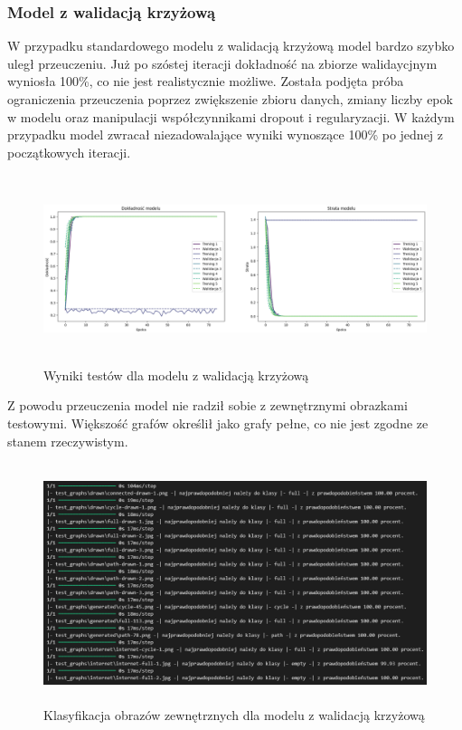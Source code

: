 \subsubsection{Model z walidacją krzyżową}

W przypadku standardowego modelu z walidacją krzyżową model bardzo szybko uległ przeuczeniu.
Już po szóstej iteracji dokładność na zbiorze walidaycjnym wyniosła 100\%, co nie jest realistycznie możliwe.
Została podjęta próba ograniczenia przeuczenia poprzez zwiększenie zbioru danych, zmiany liczby epok w modelu
oraz manipulacji współczynnikami dropout i regularyzacji.
W każdym przypadku model zwracał niezadowalające wyniki wynoszące 100\% po jednej z początkowych iteracji.

\begin{figure}[ht]
	\centering
	\includegraphics[height=5.5cm]{partials/images/tests/v2_crossvalid.png}
	\caption{Wyniki testów dla modelu z walidacją krzyżową}
	\label{Fig:tests-cv-1}
\end{figure}
\FloatBarrier

Z powodu przeuczenia model nie radził sobie z zewnętrznymi obrazkami testowymi.
Większość grafów określił jako grafy pełne, co nie jest zgodne ze stanem rzeczywistym.

\begin{figure}[ht]
	\centering
	\includegraphics[height=7cm]{partials/images/tests/v2_crossvalid_img_tests.png}
	\caption{Klasyfikacja obrazów zewnętrznych dla modelu z walidacją krzyżową}
	\label{Fig:tests-cv-2}
\end{figure}
\FloatBarrier

